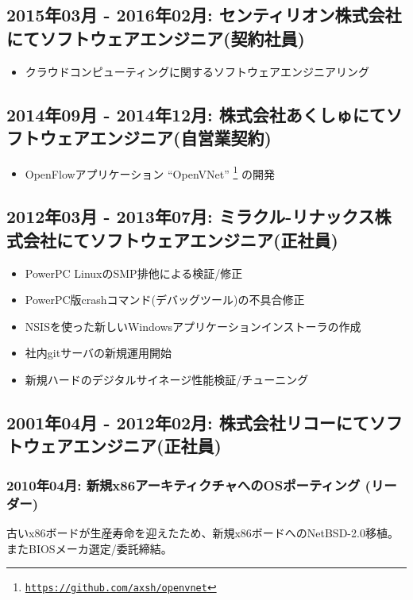 \documentclass[letterpaper]{article}
\begin{document}
\subsection*{2015年03月 - 2016年02月: センティリオン株式会社にてソフトウェアエンジニア(契約社員)}

\begin{itemize}
  \item クラウドコンピューティングに関するソフトウェアエンジニアリング
\end{itemize}

\subsection*{2014年09月 - 2014年12月: 株式会社あくしゅにてソフトウェアエンジニア(自営業契約)}

\begin{itemize}
  \item OpenFlowアプリケーション ``OpenVNet'' \footnote{\href{https://github.com/axsh/openvnet}{\tt https://github.com/axsh/openvnet}} の開発
\end{itemize}

\subsection*{2012年03月 - 2013年07月: ミラクル-リナックス株式会社にてソフトウェアエンジニア(正社員)}

\begin{itemize}
  \item PowerPC LinuxのSMP排他による検証/修正
  \item PowerPC版crashコマンド(デバッグツール)の不具合修正
  \item NSISを使った新しいWindowsアプリケーションインストーラの作成
  \item 社内gitサーバの新規運用開始
  \item 新規ハードのデジタルサイネージ性能検証/チューニング
\end{itemize}

\subsection*{2001年04月 - 2012年02月: 株式会社リコーにてソフトウェアエンジニア(正社員)}
\subsubsection*{2010年04月: 新規x86アーキティクチャへのOSポーティング (リーダー)}
古いx86ボードが生産寿命を迎えたため、新規x86ボードへのNetBSD-2.0移植。またBIOSメーカ選定/委託締結。
\end{document}

